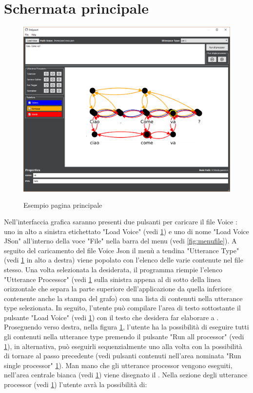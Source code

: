 	\section{Schermata principale}
		\begin{figure}[htp]
			\caption{Esempio pagina principale}
			\centering
			\includegraphics[width=\textwidth]{../img/paginainiziale.png}
			\label{fig:GUI}
		\end{figure}	
		Nell'interfaccia grafica saranno presenti due pulsanti per caricare il file Voice : uno in alto a sinistra etichettato "Load Voice" (vedi \ref{fig:GUI}) e uno di nome "Load Voice JSon" all'interno della voce "File" nella barra del menu (vedi \ref{fig:menufile}).
		 A seguito del caricamento del file Voice Json il menù a tendina "Utterance Type" (vedi \ref{fig:GUI} in alto a destra) viene popolato con l'elenco delle varie  contenute nel file stesso. 
		 Una volta selezionata la  desiderata, il programma riempie l'elenco "Utterance Processor" (vedi \ref{fig:GUI} sulla sinistra appena al di sotto della linea orizzontale che separa la parte superiore dell'applicazione da quella inferiore contenente anche la stampa del grafo) con una lista di  contenuti nella utterance type selezionata. 
		 In seguito, l'utente può compilare l'area di testo sottostante il pulsante "Load Voice" (vedi \ref{fig:GUI}) con il testo che desidera far elaborare a .
		 Proseguendo verso destra, nella figura \ref{fig:GUI}, l'utente ha la possibilità di eseguire tutti gli  contenuti nella utterance type premendo il pulsante "Run all processor" (vedi \ref{fig:GUI}), in alternativa, può eseguirli sequenzialmente uno alla volta con la possibilità di tornare al passo precedente (vedi pulsanti contenuti nell'area nominata "Run single processor" \ref{fig:GUI}).  Man mano che gli utterance processor vengono eseguiti, nell'area centrale bianca (vedi \ref{fig:GUI}) viene disegnato il . Nella sezione degli utterance processor (vedi \ref{fig:GUI}) l'utente avrà la possibilità di:
